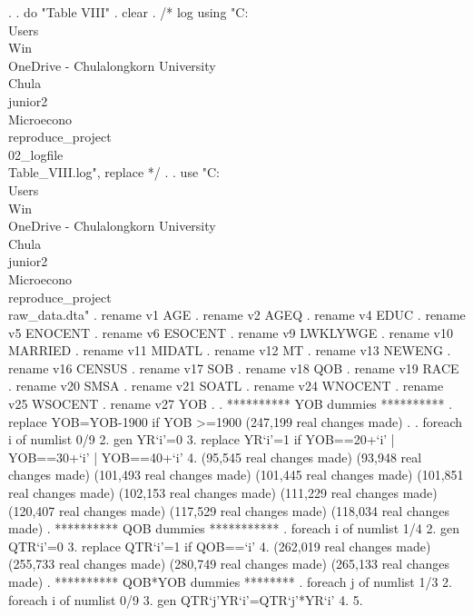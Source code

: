 . 
. do "Table VIII"
{\smallskip}
. clear
{\smallskip}
. /* log using "C:\\Users\\Win\\OneDrive - Chulalongkorn University\\Chula\\junior2\\Microecono\\reproduce_project\\02_logfile\\Table_VIII.log", replace  */
. 
. use "C:\\Users\\Win\\OneDrive - Chulalongkorn University\\Chula\\junior2\\Microecono\\reproduce_project\\raw_data.dta"
{\smallskip}
. rename v1 AGE
{\smallskip}
. rename v2 AGEQ
{\smallskip}
. rename v4 EDUC
{\smallskip}
. rename v5 ENOCENT
{\smallskip}
. rename v6 ESOCENT
{\smallskip}
. rename v9 LWKLYWGE
{\smallskip}
. rename v10 MARRIED
{\smallskip}
. rename v11 MIDATL
{\smallskip}
. rename v12 MT
{\smallskip}
. rename v13 NEWENG
{\smallskip}
. rename v16 CENSUS
{\smallskip}
. rename v17 SOB
{\smallskip}
. rename v18 QOB
{\smallskip}
. rename v19 RACE
{\smallskip}
. rename v20 SMSA
{\smallskip}
. rename v21 SOATL
{\smallskip}
. rename v24 WNOCENT
{\smallskip}
. rename v25 WSOCENT
{\smallskip}
. rename v27 YOB
{\smallskip}
. 
. **********  YOB dummies **********
. replace YOB=YOB-1900 if YOB >=1900
(247,199 real changes made)
{\smallskip}
. 
. foreach i of numlist 0/9 {\lbr}
  2. gen YR`i'=0
  3. replace YR`i'=1 if YOB==20+`i' | YOB==30+`i' | YOB==40+`i' 
  4. {\rbr}
(95,545 real changes made)
(93,948 real changes made)
(101,493 real changes made)
(101,445 real changes made)
(101,851 real changes made)
(102,153 real changes made)
(111,229 real changes made)
(120,407 real changes made)
(117,529 real changes made)
(118,034 real changes made)
{\smallskip}
. **********  QOB dummies ***********
. foreach i of numlist 1/4 {\lbr}
  2. gen QTR`i'=0
  3. replace QTR`i'=1 if QOB==`i'
  4. {\rbr}
(262,019 real changes made)
(255,733 real changes made)
(280,749 real changes made)
(265,133 real changes made)
{\smallskip}
. **********  QOB*YOB dummies ********
. foreach j of numlist 1/3 {\lbr}
  2. foreach i of numlist 0/9 {\lbr}
  3. gen QTR`j'YR`i'=QTR`j'*YR`i'
  4. {\rbr}
  5. {\rbr}
